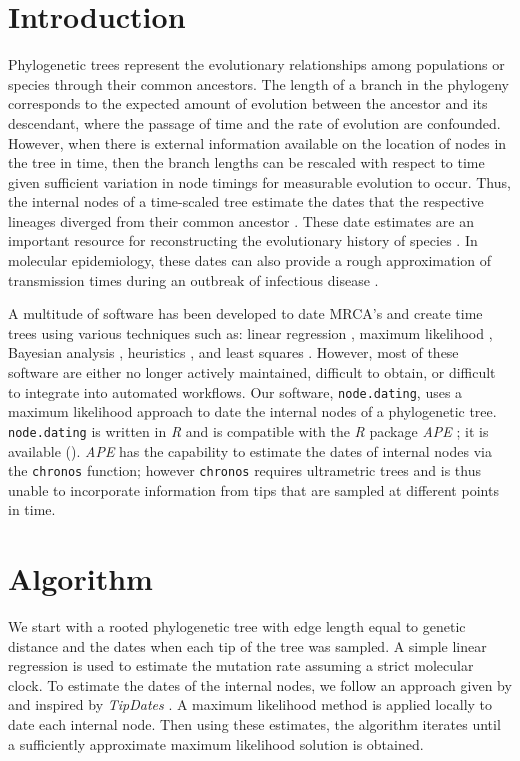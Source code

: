 \documentclass{bioinfo}
\newcommand{\code}[1]{{\tt #1}}
\begin{document}
\section{Introduction} \label{sec:intro}
Phylogenetic trees represent the evolutionary relationships among populations or species through their common ancestors.  
The length of a branch in the phylogeny corresponds to the expected amount of evolution between the ancestor and its descendant, where the passage of time and the rate of evolution are confounded.
However, when there is external information available on the location of nodes in the tree in time, then the branch lengths can be rescaled with respect to time given sufficient variation in node timings for measurable evolution to occur.
Thus, the internal nodes of a time-scaled tree estimate the dates that the respective lineages diverged from their common ancestor \citep{Kumar16}.
These date estimates are an important resource for reconstructing the evolutionary history of species \citep{Shapiro04}.
In molecular epidemiology, these dates can also provide a rough approximation of transmission times during an outbreak of infectious disease \citep{Ypma13}.

A multitude of software has been developed to date MRCA's and create time trees using various techniques such as: linear regression \citep{Tempest}, maximum likelihood \citep{TipDates, r8ts, PAML}, Bayesian analysis \citep{BEAST}, heuristics \citep{UPGMA, TREBLE}, and least squares \citep{LSD}.
However, most of these software are either no longer actively maintained, difficult to obtain, or difficult to integrate into automated workflows.
Our software, \code{node.dating}, uses a maximum likelihood approach to date the internal nodes of a phylogenetic tree.
\code{node.dating} is written in \emph{R} and is compatible with the \emph{R} package \emph{APE} \citep{APE}; it is available ().
\emph{APE} has the capability to estimate the dates of internal nodes via the \code{chronos} function; however \code{chronos} requires ultrametric trees and is thus unable to incorporate information from tips that are sampled at different points in time.

\section{Algorithm} \label{sec:alg}
We start with a rooted phylogenetic tree with edge length equal to genetic distance and the dates when each tip of the tree was sampled.
A simple linear regression is used to estimate the mutation rate assuming a strict molecular clock.
To estimate the dates of the internal nodes, we follow an approach given by \cite{Felsenstein81} and inspired by \emph{TipDates} \citep{TipDates}.
A maximum likelihood method is applied locally to date each internal node.
Then using these estimates, the algorithm iterates until a sufficiently approximate maximum likelihood solution is obtained.
\end{document}

